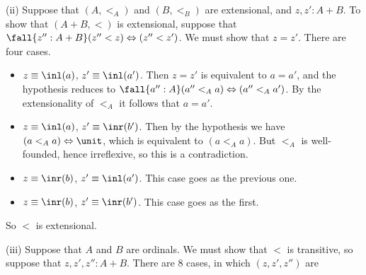 \vspace{.1in}
\noindent
(ii) Suppose that $(A, <_{A})$ and $(B, <_{B})$ are extensional, and $z, z' : A
+ B$.  To show that $(A + B, <)$ is extensional, suppose that $\fall{z'' : A +
B}(z'' < z) \Leftrightarrow (z'' < z')$.  We must show that $z = z'$.  There
are four cases.



\begin{itemize}
\item  $z \equiv \inl(a)$, $z' \equiv \inl(a')$.  Then $z = z'$ is equivalent to $a
   = a'$, and the hypothesis reduces to $\fall{a'' : A}(a'' <_{A} a)
   \Leftrightarrow (a'' <_{A} a')$.  By the extensionality of $<_{A}$ it
   follows that $a = a'$.

\item  $z \equiv \inl(a)$, $z' \equiv \inr(b')$.  Then by the hypothesis we have
   $(a <_{A} a) \Leftrightarrow \unit$, which is equivalent to $(a <_{A} a)$.
   But $<_{A}$ is well-founded, hence irreflexive, so this is a contradiction.

\item  $z \equiv \inr(b)$, $z' \equiv \inl(a')$.  This case goes as the previous
   one.

\item  $z \equiv \inr(b)$, $z' \equiv \inr(b')$.  This case goes as the first.

\end{itemize}
So $<$ is extensional.


\vspace{.1in}
\noindent
(iii)
Suppose that $A$ and $B$ are ordinals.  We must show that $<$ is transitive, so
suppose that $z, z', z'' : A + B$.  There are 8 cases, in which $(z, z', z'')$
are



